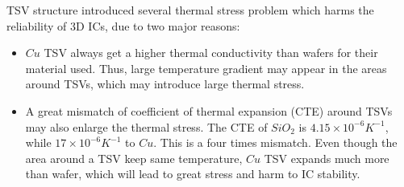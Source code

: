 TSV structure introduced several thermal stress problem which harms the reliability of 3D ICs, due to
two major reasons:
\begin{itemize}
    \item $Cu$ TSV always get a higher thermal conductivity than wafers for their material used.
    Thus, large temperature gradient may appear in the areas around TSVs, which may
    introduce large thermal stress.
    \item A great mismatch of coefficient of thermal expansion (CTE) around TSVs may also enlarge 
    the thermal stress. The CTE of $SiO_2$ is $4.15\times10^{-6}K^{-1}$, while
    $17\times10^{-6}K^{-1}$ to $Cu$. This is a four times mismatch.
    Even though the area around a TSV keep same temperature, $Cu$ TSV expands much more than
    wafer, which will lead to great stress and harm to IC stability.
\end{itemize}

